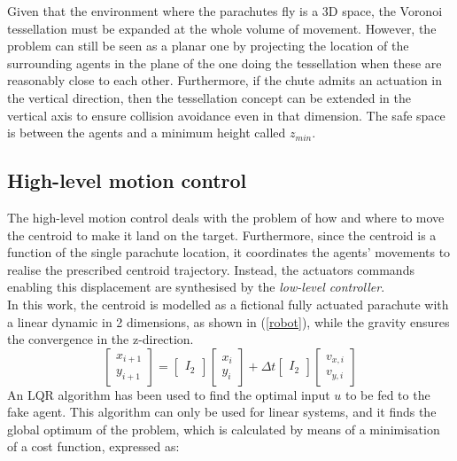 Given that the environment where the parachutes fly is a 3D space, the Voronoi tessellation must be expanded at the whole volume of movement. However, the problem can still be seen as a planar one by projecting the location of the surrounding agents in the plane of the one doing the tessellation when these are reasonably close to each other. Furthermore, if the chute admits an actuation in the vertical direction, then the tessellation concept can be extended in the vertical axis to ensure collision avoidance even in that dimension. The safe space is between the agents and a minimum height called $z_{min}$.

\subsection{High-level motion control}
The high-level motion control deals with the problem of how and where to move the centroid to make it land on the target. Furthermore, since the centroid is a function of the single parachute location, it coordinates the agents' movements to realise the prescribed centroid trajectory. Instead, the actuators commands enabling this displacement are synthesised by the \textit{low-level controller}.\\
In this work, the centroid is modelled as a fictional fully actuated parachute with a linear dynamic in 2 dimensions, as shown in (\ref{robot}), while the gravity ensures the convergence in the z-direction.
\begin{equation}
    \begin{bmatrix}
        x_{i+1}\\
        y_{i+1}
    \end{bmatrix}=
    \begin{bmatrix}
        I_2
    \end{bmatrix}
    \begin{bmatrix}
        x_i\\
        y_i
    \end{bmatrix}
    +\Delta t\begin{bmatrix}
        I_2
    \end{bmatrix}
    \begin{bmatrix}
        v_{x,i}\\
        v_{y,i}
    \end{bmatrix}
    \label{robot}
\end{equation}
An LQR algorithm \cite{b15} has been used to find the optimal input $u$ to be fed to the fake agent. This algorithm can only be used for linear systems, and it finds the global optimum of the problem, which is calculated by means of a minimisation of a cost function, expressed as:
